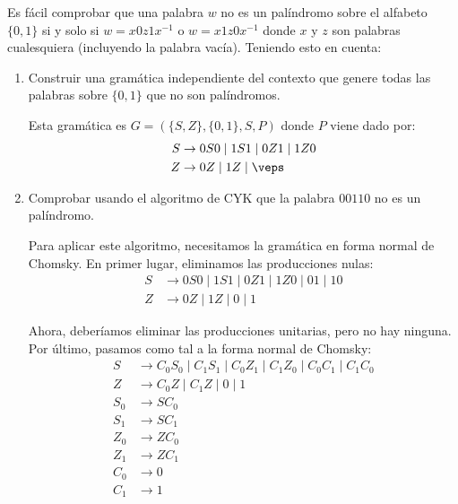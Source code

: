 \documentclass[12pt]{article}
\begin{document}
\begin{ejercicio}[2.5 puntos]
    Es fácil comprobar que una palabra $w$ no es un palíndromo sobre el alfabeto $\{0, 1\}$ si y solo si $w = x0z1x^{-1}$ o $w = x1z0x^{-1}$ donde $x$ y $z$ son palabras cualesquiera (incluyendo la palabra vacía). Teniendo esto en cuenta:
    \begin{enumerate}
        \item Construir una gramática independiente del contexto que genere todas las palabras sobre $\{0, 1\}$ que no son palíndromos.
        
        Esta gramática es $G=(\{S,Z\}, \{0,1\}, S, P)$ donde $P$ viene dado por:
        \begin{align*}
            S &\rightarrow 0S0 \mid 1S1 \mid 0Z1 \mid 1Z0\\
            Z &\rightarrow 0Z \mid 1Z \mid \veps
        \end{align*}
        \item Comprobar usando el algoritmo de CYK que la palabra $00110$ no es un palíndromo.
        
        Para aplicar este algoritmo, necesitamos la gramática en forma normal de Chomsky. En primer lugar, eliminamos las producciones nulas:
        \begin{align*}
            S &\rightarrow 0S0 \mid 1S1 \mid 0Z1 \mid 1Z0 \mid 01 \mid 10\\
            Z &\rightarrow 0Z \mid 1Z \mid 0\mid 1
        \end{align*}

        Ahora, deberíamos eliminar las producciones unitarias, pero no hay ninguna. Por último, pasamos como tal a la forma normal de Chomsky:
        \begin{align*}
            S &\rightarrow C_0S_0 \mid C_1S_1 \mid C_0Z_1 \mid C_1Z_0 \mid C_0C_1 \mid C_1C_0\\
            Z &\rightarrow C_0Z \mid C_1Z \mid 0\mid 1\\
            S_0 &\rightarrow SC_0\\
            S_1 &\rightarrow SC_1\\
            Z_0 &\rightarrow ZC_0\\
            Z_1 &\rightarrow ZC_1\\
            C_0 &\rightarrow 0\\
            C_1 &\rightarrow 1
        \end{align*}


\end{enumerate}
\end{ejercicio}
\end{document}
